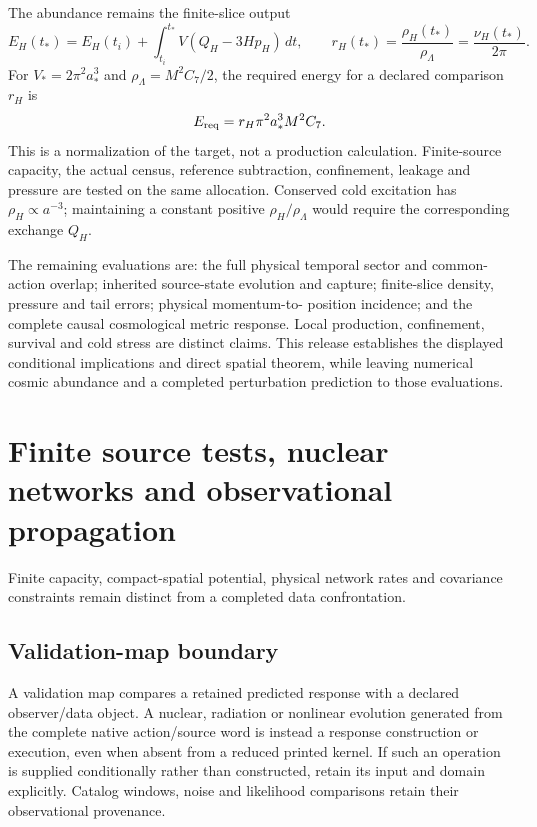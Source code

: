\documentclass[12pt,a4paper]{article}
\begin{document}
The abundance remains the finite-slice output
\[
 E_H(t_*)=E_H(t_i)+
       \int_{t_i}^{t_*}V(Q_H-3Hp_H)\,dt,\qquad
 r_H(t_*)=\frac{\rho_H(t_*)}{\rho_\Lambda}
          =\frac{\nu_H(t_*)}{2\pi}.
\]
For \(V_*=2\pi^2a_*^3\) and \(\rho_\Lambda=M^2C_7/2\),
the required energy for a declared comparison \(r_H\) is
\[
 E_{\rm req}=r_H\pi^2a_*^3M^2C_7.
\]
This is a normalization of the target, not a production calculation.
Finite-source capacity, the actual census, reference subtraction,
confinement, leakage and pressure are tested on the same allocation.
Conserved cold excitation has \(\rho_H\propto a^{-3}\); maintaining a
constant positive \(\rho_H/\rho_\Lambda\) would require the corresponding
exchange \(Q_H\).

The remaining evaluations are: the full physical temporal sector and
common-action overlap; inherited source-state evolution and capture;
finite-slice density, pressure and tail errors; physical momentum-to-
position incidence; and the complete causal cosmological metric response.
Local production, confinement, survival and cold stress are distinct
claims. This release establishes the displayed conditional implications
and direct spatial theorem, while leaving numerical cosmic abundance
and a completed perturbation prediction to those evaluations.



\section{Finite source tests, nuclear networks and observational propagation}
\label{p6b:sec:organized-b6}
Finite capacity, compact-spatial potential, physical network rates and covariance constraints remain distinct from a completed data confrontation.

\subsection{Validation-map boundary}
\label{p9:app:validation-map-boundary}

\begin{definition}
A validation map compares a retained predicted response with a declared
observer/data object.  A nuclear, radiation or nonlinear evolution generated
from the complete native action/source word is instead a response construction
or execution, even when absent from a reduced printed kernel.  If such an
operation is supplied conditionally rather than constructed, retain its input
and domain explicitly.  Catalog windows, noise and likelihood comparisons
retain their observational provenance.
\end{definition}
\end{document}
